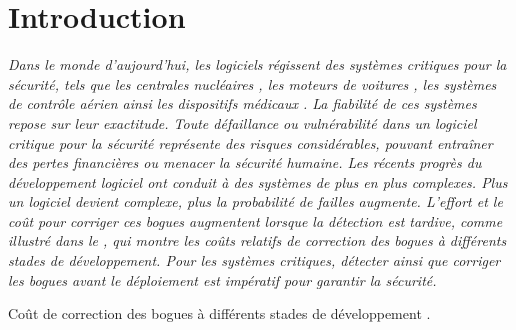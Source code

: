 \setcounter{sidenote}{0}

\chapter*{Introduction}

{\em
Dans le monde d'aujourd'hui, les logiciels régissent des systèmes critiques pour la sécurité, tels que les centrales nucléaires , les moteurs de voitures , les systèmes de contrôle aérien  ainsi les dispositifs médicaux . La fiabilité de ces systèmes repose sur leur exactitude. Toute défaillance ou vulnérabilité dans un logiciel critique pour la sécurité représente des risques considérables, pouvant entraîner des pertes financières ou menacer la sécurité humaine. Les récents progrès du développement logiciel ont conduit à des systèmes de plus en plus complexes. Plus un logiciel devient complexe, plus la probabilité de failles augmente. L'effort et le coût pour corriger ces bogues augmentent lorsque la détection est tardive, comme illustré dans le  , qui montre les coûts relatifs de correction des bogues à différents stades de développement. Pour les systèmes critiques, détecter ainsi que corriger les bogues avant le déploiement est impératif pour garantir la sécurité.
}

\begin{margintable}
  \caption{Coût de correction des bogues à différents stades de développement \cite{White2017}.}
  \centering
\end{margintable}

